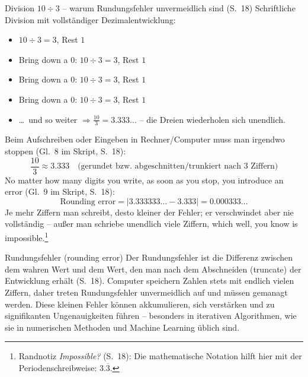 \begin{bspbox}{Division $10 \div 3$ -- warum Rundungsfehler unvermeidlich sind (S.~18)}
Schriftliche Division mit vollständiger Dezimalentwicklung:
\begin{itemize}[itemsep=0pt]
  \item $10 \div 3 = 3$, Rest $1$
  \item \glqq Bring down a 0\grqq: $10 \div 3 = 3$, Rest $1$
  \item \glqq Bring down a 0\grqq: $10 \div 3 = 3$, Rest $1$
  \item \glqq Bring down a 0\grqq: $10 \div 3 = 3$, Rest $1$
  \item \dots\ und so weiter $\Rightarrow \frac{10}{3} = 3.333\ldots$ -- die Dreien wiederholen sich unendlich.
\end{itemize}
Beim Aufschreiben oder Eingeben in Rechner/Computer muss man irgendwo stoppen (Gl.~8 im Skript, S.~18):
\[
\frac{10}{3} \approx 3.333 \quad \text{(gerundet bzw.\ abgeschnitten/trunkiert nach 3 Ziffern)}
\]
\glqq No matter how many digits you write, as soon as you stop, you introduce an error\grqq{} (Gl.~9 im Skript, S.~18):
\[
\text{Rounding error} = |3.333333\ldots - 3.333| = 0.000333\ldots
\]
Je mehr Ziffern man schreibt, desto kleiner der Fehler; er verschwindet aber nie vollständig -- außer man schriebe unendlich viele Ziffern, \glqq which well, you know is impossible.\grqq{}\footnote{Randnotiz \emph{Impossible?} (S.~18): Die mathematische Notation hilft hier mit der Periodenschreibweise: $3.\overline{3}$.}
\end{bspbox}

\begin{defbox}{Rundungsfehler (rounding error)}
Der Rundungsfehler ist die Differenz zwischen dem wahren Wert und dem Wert, den man nach dem Abschneiden (truncate) der Entwicklung erhält (S.~18). Computer speichern Zahlen stets mit endlich vielen Ziffern, daher treten Rundungsfehler unvermeidlich auf und müssen gemanagt werden. Diese kleinen Fehler können akkumulieren, sich verstärken und zu signifikanten Ungenauigkeiten führen -- besonders in iterativen Algorithmen, wie sie in numerischen Methoden und Machine Learning üblich sind.
\end{defbox}

